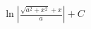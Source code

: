 \documentclass[preview]{standalone}
\begin{document}
\begin{align*}
\ln|\frac{\sqrt{a^2+x^2}+x}{a}|+C
\end{align*}
\end{document}

